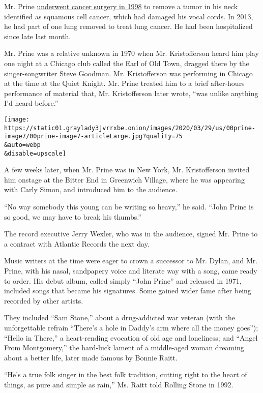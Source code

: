 Mr. Prine
\href{https://oralcancerfoundation.org/people/arts-entertainment/john-prine/}{underwent
cancer surgery in 1998} to remove a tumor in his neck identified as
squamous cell cancer, which had damaged his vocal cords. In 2013, he had
part of one lung removed to treat lung cancer. He had been hospitalized
since late last month.

Mr. Prine was a relative unknown in 1970 when Mr. Kristofferson heard
him play one night at a Chicago club called the Earl of Old Town,
dragged there by the singer-songwriter Steve Goodman. Mr. Kristofferson
was performing in Chicago at the time at the Quiet Knight. Mr. Prine
treated him to a brief after-hours performance of material that, Mr.
Kristofferson later wrote, ``was unlike anything I'd heard before.''

\texttt{[image: https://static01.graylady3jvrrxbe.onion/images/2020/03/29/us/00prine-image7/00prine-image7-articleLarge.jpg?quality=75\\\&auto=webp\\\&disable=upscale]}

A few weeks later, when Mr. Prine was in New York, Mr. Kristofferson
invited him onstage at the Bitter End in Greenwich Village, where he was
appearing with Carly Simon, and introduced him to the audience.

``No way somebody this young can be writing so heavy,'' he said. ``John
Prine is so good, we may have to break his thumbs.''

The record executive Jerry Wexler, who was in the audience, signed Mr.
Prine to a contract with Atlantic Records the next day.

Music writers at the time were eager to crown a successor to Mr. Dylan,
and Mr. Prine, with his nasal, sandpapery voice and literate way with a
song, came ready to order. His debut album, called simply ``John Prine''
and released in 1971, included songs that became his signatures. Some
gained wider fame after being recorded by other artists.

They included ``Sam Stone,'' about a drug-addicted war veteran (with the
unforgettable refrain ``There's a hole in Daddy's arm where all the
money goes''); ``Hello in There,'' a heart-rending evocation of old age
and loneliness; and ``Angel From Montgomery,'' the hard-luck lament of a
middle-aged woman dreaming about a better life, later made famous by
Bonnie Raitt.

``He's a true folk singer in the best folk tradition, cutting right to
the heart of things, as pure and simple as rain,'' Ms. Raitt told
Rolling Stone in 1992.

